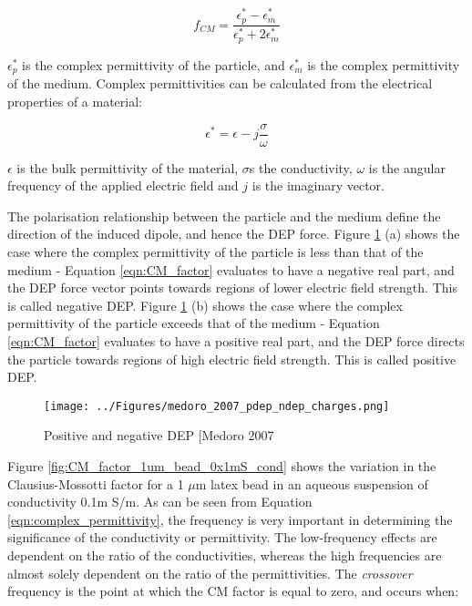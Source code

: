 \begin{equation}
 f_{CM} =  \frac{\epsilon_{p}^{*}-\epsilon_{m}^{*}}{\epsilon_{p}^{*}+2\epsilon_{m}^{*}}
\label{eqn:CM_factor}
\end{equation}

$\epsilon_{p}^{*}$ is the complex permittivity of the particle, and $\epsilon_{m}^{*}$ is the complex permittivity of the medium. Complex permittivities can be calculated from the electrical properties of a material:

\begin{equation}
 \epsilon^{*} = \epsilon - j \frac{\sigma}{\omega}
\label{eqn:complex_permittivity}
\end{equation}

$\epsilon$ is the bulk permittivity of the material, $\sigma$s the conductivity, $\omega$ is the angular frequency of the applied electric field and $j$ is the imaginary vector.

The polarisation relationship between the particle and the medium define the direction of the induced dipole, and hence the DEP force. Figure \ref{fig:medoro_2007_pdep_ndep_charges} (a) shows the case where the complex permittivity of the particle is less than that of the medium - Equation \ref{eqn:CM_factor} evaluates to have a negative real part, and the DEP force vector points towards regions of lower electric field strength. This is called negative DEP. Figure \ref{fig:medoro_2007_pdep_ndep_charges} (b) shows the case where the complex permittivity of the particle exceeds that of the medium - Equation \ref{eqn:CM_factor} evaluates to have a positive real part, and the DEP force directs the particle towards regions of high electric field strength. This is called positive DEP.

\begin{figure}
 \centering
 \texttt{[image: ../Figures/medoro\_2007\_pdep\_ndep\_charges.png]}
 \caption{Positive and negative DEP [Medoro 2007}
 \label{fig:medoro_2007_pdep_ndep_charges}
\end{figure}

Figure \ref{fig:CM_factor_1um_bead_0x1mS_cond} shows the variation in the Clausius-Mossotti factor for a 1 $\mu$m latex bead in an aqueous suspension of conductivity 0.1m S/m. As can be seen from Equation \ref{eqn:complex_permittivity}, the frequency is very important in determining the significance of the conductivity or permittivity. The low-frequency effects are dependent on the ratio of the conductivities, whereas the high frequencies are almost solely dependent on the ratio of the permittivities. The \textit{crossover} frequency is the point at which the CM factor is equal to zero, and occurs when:

